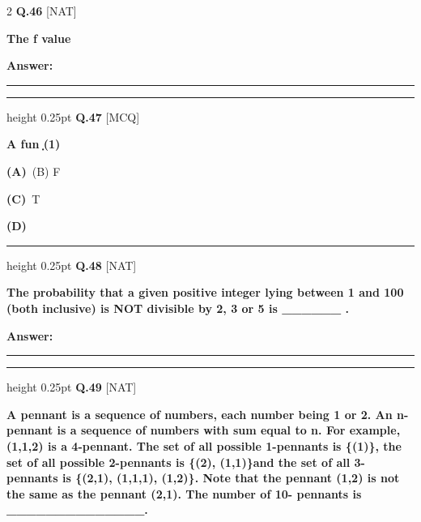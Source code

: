 \documentclass[a4paper,10pt,twoside]{article}
\begin{document}
\begin{multicols}{2}
\noindent\textbf{Q.46} \hfill {\footnotesize\textsf{[NAT]}}
\par\vspace{2pt}
{\bfseries The f
value \par}
\par\vspace{3pt}\noindent\textbf{Answer:} \rule{3.2cm}{0.4pt}
\par\vspace{6pt}\hrule height 0.25pt\vspace{6pt}
\noindent\textbf{Q.47} \hfill {\footnotesize\textsf{[MCQ]}}
\par\vspace{2pt}
{\bfseries A fun݂
(1) \par}
\par\vspace{2pt}\noindent
\textbf{(A)}~(B) F\par\vspace{2pt}\noindent
\textbf{(C)}~T\par\vspace{2pt}\noindent
\textbf{(D)}~
\par\vspace{6pt}\hrule height 0.25pt\vspace{6pt}
\noindent\textbf{Q.48} \hfill {\footnotesize\textsf{[NAT]}}
\par\vspace{2pt}
{\bfseries The probability that a given positive integer lying between 1 and 100 (both inclusive) is NOT
divisible by 2, 3 or 5 is \_\_\_\_\_\_ . \par}
\par\vspace{3pt}\noindent\textbf{Answer:} \rule{3.2cm}{0.4pt}
\par\vspace{6pt}\hrule height 0.25pt\vspace{6pt}
\noindent\textbf{Q.49} \hfill {\footnotesize\textsf{[NAT]}}
\par\vspace{2pt}
{\bfseries A pennant is a sequence of numbers, each number being 1 or 2. An n-pennant is a sequence of
numbers with sum equal to n. For example, (1,1,2) is a 4-pennant. The set of all possible 1-pennants
is \{(1)\}, the set of all possible 2-pennants is \{(2), (1,1)\}and the set of all 3-pennants is \{(2,1),
(1,1,1), (1,2)\}. Note that the pennant (1,2) is not the same as the pennant (2,1). The number of 10-
pennants is \_\_\_\_\_\_\_\_\_\_\_\_\_\_. \par}

\end{multicols}
\end{document}
